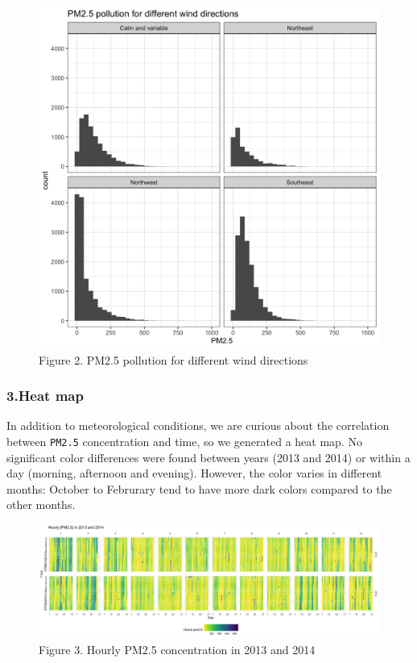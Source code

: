 \documentclass[
]{article}
\begin{document}
\begin{figure}
\centering
\includegraphics{../images/facted_hist.png}
\caption{Figure 2. PM2.5 pollution for different wind directions}
\end{figure}

\hypertarget{heat-map}{%
\subsubsection{3.Heat map}\label{heat-map}}

In addition to meteorological conditions, we are curious about the
correlation between \texttt{PM2.5} concentration and time, so we
generated a heat map. No significant color differences were found
between years (2013 and 2014) or within a day (morning, afternoon and
evening). However, the color varies in different months: October to
Februrary tend to have more dark colors compared to the other months.

\begin{figure}
\centering
\includegraphics{../images/heatmap.png}
\caption{Figure 3. Hourly PM2.5 concentration in 2013 and 2014}
\end{figure}
\end{document}
